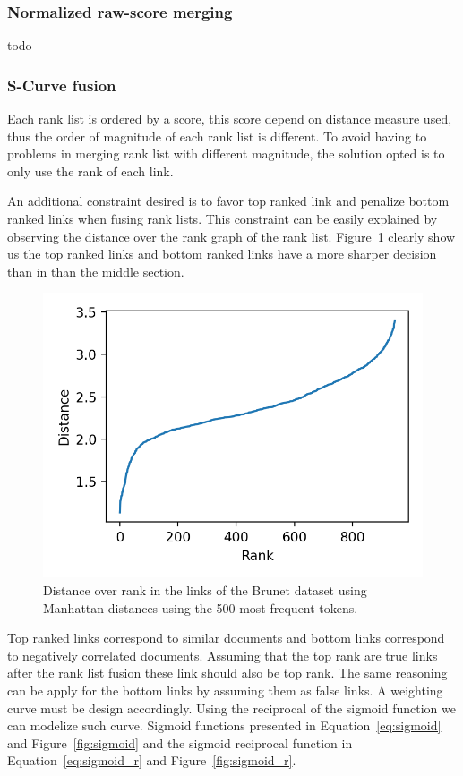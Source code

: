 \subsubsection{Normalized raw-score merging}

todo

\subsubsection{S-Curve fusion}

Each rank list is ordered by a score, this score depend on distance measure used, thus the order of magnitude of each rank list is different.
To avoid having to problems in merging rank list with different magnitude, the solution opted is to only use the rank of each link.

An additional constraint desired is to favor top ranked link and penalize bottom ranked links when fusing rank lists.
This constraint can be easily explained by observing the distance over the rank graph of the rank list.
Figure~\ref{fig:distance_over_rank} clearly show us the top ranked links and bottom ranked links have a more sharper decision than in than the middle section.

\begin{figure}
  \includegraphics[width=\linewidth]{img/distance_over_rank.png}
  \caption{Distance over rank in the links of the Brunet dataset using Manhattan distances using the 500 most frequent tokens.}
  \label{fig:distance_over_rank}
\end{figure}

Top ranked links correspond to similar documents and bottom links correspond to negatively correlated documents.
Assuming that the top rank are true links after the rank list fusion these link should also be top rank.
The same reasoning can be apply for the bottom links by assuming them as false links.
A weighting curve must be design accordingly.
Using the reciprocal of the sigmoid function we can modelize such curve.
Sigmoid functions presented in Equation~\ref{eq:sigmoid} and Figure~\ref{fig:sigmoid} and the sigmoid reciprocal function in Equation~\ref{eq:sigmoid_r} and Figure~\ref{fig:sigmoid_r}.

